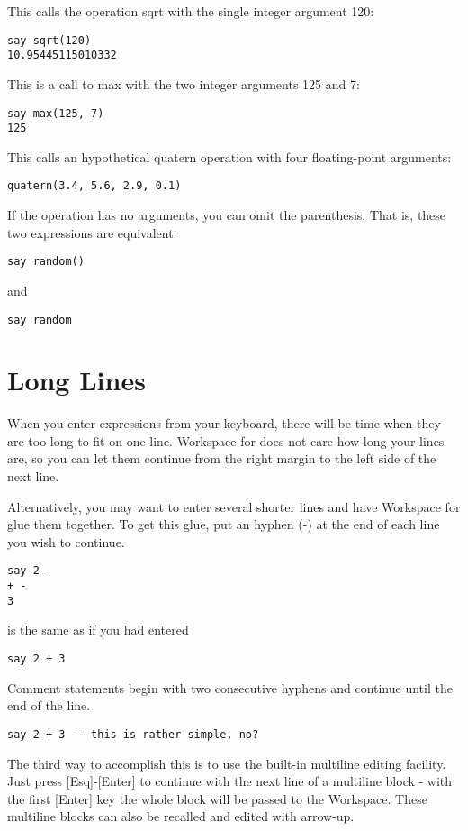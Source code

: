 This calls the operation sqrt with the single integer argument 120:
\begin{verbatim}
say sqrt(120)
10.95445115010332
\end{verbatim}
This is a call to max with the two integer arguments 125 and 7:

\begin{verbatim}
say max(125, 7)
125
\end{verbatim}
This calls an hypothetical quatern operation with four floating-point arguments:

\begin{verbatim}
quatern(3.4, 5.6, 2.9, 0.1)
\end{verbatim}
If the operation has no arguments, you can omit the parenthesis. That is, these two expressions are equivalent:

\begin{verbatim}
say random()
\end{verbatim}
and

\begin{verbatim}
say random
\end{verbatim}

 \section{Long Lines}

When you enter expressions from your keyboard, there will be time when they are too long to fit on one line. Workspace for \nr{} does not care how long your lines are, so you can let them continue from the right margin to the left side of the next line.

Alternatively, you may want to enter several shorter lines and have Workspace for \nr{} glue them together. To get this glue, put an hyphen (-) at the end of each line you wish to continue.
\begin{verbatim}
say 2 -
+ -
3
\end{verbatim}
is the same as if you had entered

\begin{verbatim}
say 2 + 3
\end{verbatim}
Comment statements begin with two consecutive hyphens and continue until the end of the line.

\begin{verbatim}
say 2 + 3 -- this is rather simple, no?
\end{verbatim}

The third way to accomplish this is to use the built-in multiline
editing facility. Just press [Esq]-[Enter] to continue with the next
line of a multiline block - with the first [Enter] key the whole block
will be passed to the Workspace. These multiline blocks can also be
recalled and edited with arrow-up.

